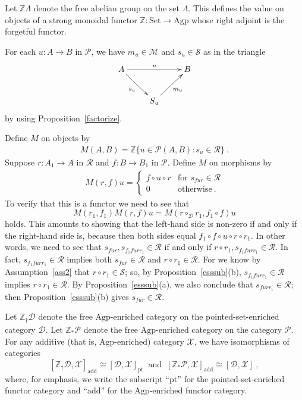 \documentclass[a4paper,12pt,reqno]{amsart}
\theoremstyle{definition}
\theoremstyle{fact}
\theoremstyle{genquest}
\theoremstyle{step}
\newcommand{\dd}{\colon}
\newcommand{\ra}{\rightarrow}
\def\CD{{\mathscr D}}
\def\CM{{\mathscr M}}
\def\CP{{\mathscr P}}
\def\CR{{\mathscr R}}
\def\CS{{\mathscr S}}
\def\CX{{\mathscr X}}
\begin{document}
Let $\mathbb{Z}\Lambda$ denote the free abelian group on the set $\Lambda$.
This defines the value on objects of a strong monoidal functor 
$\mathbb{Z} \dd \mathrm{Set} \ra \mathrm{Agp}$
whose right adjoint is the forgetful functor.

For each $u\dd A\ra B$ in $\CP$, we have $m_u\in \CM$ and $s_u\in \CS$ as in the triangle
\begin{eqnarray}\label{fact_u}
\begin{aligned}
\xymatrix{
A \ar[rd]_{s_u}\ar[rr]^{u}   && B  \\
& S_u \ar[ru]_{m_u}  &
} 
\end{aligned}
\end{eqnarray}  
by using Proposition~\ref{factorize}.

Define $M$ on objects by
\begin{eqnarray}\label{Mobj}
M(A,B) = \mathbb{Z}\{u\in \CP(A,B) \dd s_u\in \CR \} \ .
\end{eqnarray}
Suppose $r\dd A_1 \ra A$ in $\CR$ and $f\dd B\ra B_1$ in $\CP$.
Define $M$ on morphisms by
\begin{eqnarray}\label{Mmor}
M(r,f)u = 
\begin{cases}
f\circ u \circ r & \text{for }  s_{fur}\in \CR \\
0 & \text{otherwise} \ .
\end{cases}
\end{eqnarray}
To verify that this is a functor we need to see that 
$$M(r_1,f_1)M(r,f)u = M(r\circ_{\CD} r_1,f_1\circ f)u$$ holds. 
This amounts to showing
that the left-hand side is non-zero if and only if the right-hand side is, 
because then both sides
equal $f_1\circ f\circ u \circ r\circ r_1$. 
In other words, we need to see that 
$s_{fur}, s_{f_1furr_1}\in \CR$ if and only if $r\circ r_1, s_{f_1furr_1}\in \CR$.
In fact, $s_{f_1furr_1}\in \CR$ implies both $s_{fur}\in \CR$ and $r\circ r_1\in \CR$.   
For we know by Assumption~\ref{ass2} that $r\circ r_1 \in \CS$; 
so, by Proposition~\ref{esssub}(b), $s_{f_1furr_1}\in \CR$ implies $r\circ r_1 \in \CR$.
By Proposition~\ref{esssub}(a), we also conclude that $s_{furr_1}\in \CR$;
then Proposition~\ref{esssub}(b) gives $s_{fur}\in \CR$.    

Let $\mathbb{Z}_{\dagger}\CD$ denote the free $\mathrm{Agp}$-enriched category on
the pointed-set-enriched category $\CD$. Let $\mathbb{Z}_{*}\CP$ denote the free 
$\mathrm{Agp}$-enriched category on the category $\CP$. For any additive (that is,
$\mathrm{Agp}$-enriched) category $\CX$, we have isomorphisms of categories
$$[\mathbb{Z}_{\dagger}\CD,\CX]_{\mathrm{add}} \cong [\CD,\CX]_{\mathrm{pt}}
\ \text{ and } \ [\mathbb{Z}_{*}\CP,\CX]_{\mathrm{add}} \cong [\CD,\CX] \ , $$ 
where, for emphasis, we write the subscript ``$\mathrm{pt}$'' for the pointed-set-enriched
functor category and ``$\mathrm{add}$'' for the $\mathrm{Agp}$-enriched functor category.    
\end{document}
